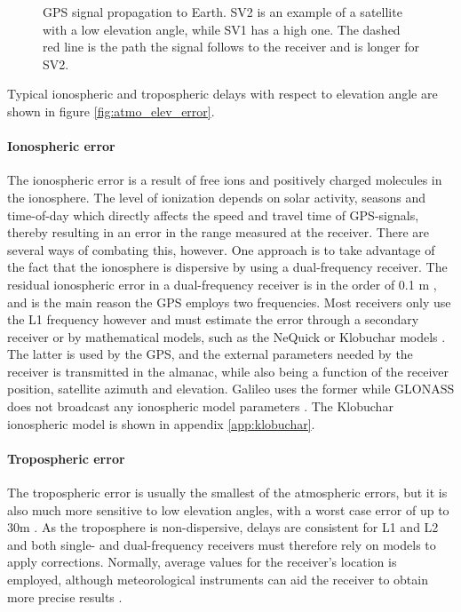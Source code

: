 \begin{figure}[!htbp]
	\centering
	
    \caption[GPS signal propagation to Earth]{GPS signal propagation to Earth. SV2 is an example of a satellite with a low elevation angle, while SV1 has a high one. The dashed red line is the path the signal follows to the receiver and is longer for SV2.}
    \label{fig:signal_prop}
\end{figure}

Typical ionospheric and tropospheric delays with respect to elevation angle are shown in figure \ref{fig:atmo_elev_error}. 

\paragraph{Ionospheric error}
The ionospheric error is a result of free ions and positively charged molecules in the ionosphere. The level of ionization depends on solar activity, seasons and time-of-day which directly affects the speed and travel time of GPS-signals, thereby resulting in an error in the range measured at the receiver. There are several ways of combating this, however. One approach is to take advantage of the fact that the ionosphere is dispersive by using a dual-frequency receiver. The residual ionospheric error in a dual-frequency receiver is in the order of 0.1 m \cite{groves2013principles}, and is the main reason the GPS employs two frequencies. Most receivers only use the L1 frequency however and must estimate the error through a secondary receiver or by mathematical models, such as the NeQuick \cite{di1990analytical} or Klobuchar models \cite{klobuchar1987ionospheric}. The latter is used by the GPS, and the external parameters needed by the receiver is transmitted in the almanac, while also being a function of the receiver position, satellite azimuth and elevation. Galileo uses the former while GLONASS does not broadcast any ionospheric model parameters \cite{groves2013principles}. The Klobuchar ionospheric model is shown in appendix \ref{app:klobuchar}.\\

\paragraph{Tropospheric error}
The tropospheric error is usually the smallest of the atmospheric errors, but it is also much more sensitive to low elevation angles, with a worst case error of up to 30m \cite{farrell2008aided}. As the troposphere is non-dispersive, delays are consistent for L1 and L2 and both single- and dual-frequency receivers must therefore rely on models to apply corrections. Normally, average values for the receiver's location is employed, although meteorological instruments can aid the receiver to obtain more precise results \cite{farrell2008aided}. \\

